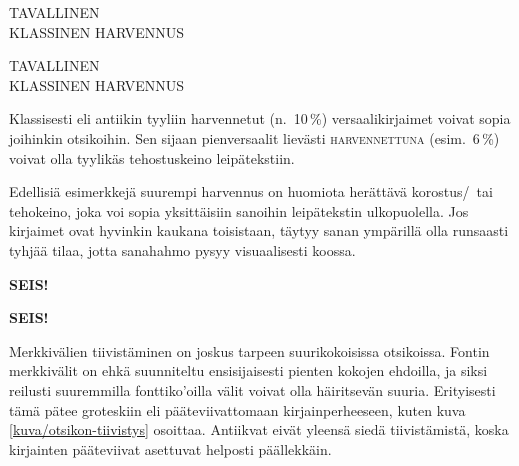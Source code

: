 \begin{koodilohkosis}
\large TAVALLINEN \\
{ KLASSINEN HARVENNUS}
\end{koodilohkosis}

\begin{tulossis}
  \large
  TAVALLINEN \\
  { KLASSINEN HARVENNUS}
\end{tulossis}

\noindent
Klassisesti eli antiikin tyyliin harvennetut (n.~10\,\%)
versaalikirjaimet voivat sopia joihinkin otsikoihin. Sen sijaan
pienversaalit lievästi {
  \textsc{harvennettuna}} (esim.~6\,\%) voivat olla tyylikäs
tehostuskeino leipätekstiin.

Edellisiä esimerkkejä suurempi harvennus on huomiota herättävä
korostus\-/\ tai tehokeino, joka voi sopia yksittäisiin sanoihin
leipätekstin ulkopuolella. Jos kirjaimet ovat hyvinkin kaukana
toisistaan, täytyy sanan ympärillä olla runsaasti tyhjää tilaa, jotta
sanahahmo pysyy visuaalisesti koossa.

\begin{koodilohkosis}
{\sffamily\bfseries{} SEIS!}
\end{koodilohkosis}

\begin{tulossis}
  {\sffamily\bfseries{} SEIS!}
\end{tulossis}

\noindent
Merkkivälien tiivistäminen on joskus tarpeen suurikokoisissa otsikoissa.
Fontin merkkivälit on ehkä suunniteltu ensisijaisesti pienten kokojen
ehdoilla, ja siksi reilusti suuremmilla fonttiko'oilla välit voivat olla
häiritsevän suuria. Erityisesti tämä pätee groteskiin eli
pääteviivattomaan kirjainperheeseen, kuten kuva
\ref{kuva/otsikon-tiivistys} osoittaa. Antiikvat eivät yleensä siedä
tiivistämistä, koska kirjainten pääteviivat asettuvat helposti
päällekkäin.


